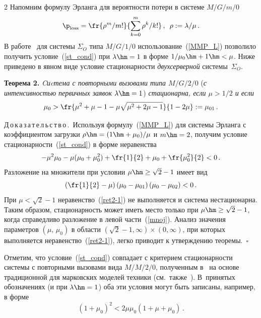 \begin{multicols}{2}
 Напомним формулу Эрланга для вероятности потери  в
 системе $M/G/m/0$~ \cite{Gnedenko}
\begin{equation} 
\label{MMP_L}
 \p_{\mathrm{loss}}=\fr{\rho^{m}/m!}{\sum\limits_{k=0}^m \rho^k/k!}\,,\enskip\rho:=\lambda/\mu\,.
\end{equation}
 В работе~\cite{MorNek} для системы $\Sigma_O$ типа $M/G/1/0 $  использование~(\ref{MMP_L})
позволило получить условие~(\ref{st_cond}) при $\lambda\hm=1$ в  форме
$1/\mu_0\hm+1\hm<\mu$. Ниже приведено в явном виде условие стационарности
{\it двухсерверной} сис\-те\-мы~$\Sigma_O$. 

\medskip

\noindent
\textbf{Теорема 2.}
 {\it Cиcтема с повторными вызовами  типа $M/G/2/0$} (\textit{с
интенсивностью первичных заявок $\lambda\hm=1$}) \textit{стационарна, если $\mu>1/2$  и
если} 
\begin{equation*} 
 \mu_0>\fr{\mu^2+\mu-1-\mu \sqrt{\mu^2+2\mu-1}}{1-2 \mu}:=\mu_{01}\,. 
\end{equation*} 

\smallskip

\noindent
Д\,о\,к\,а\,з\,а\,т\,е\,л\,ь\,с\,т\,в\,о\,.\ Используя
формулу~(\ref{MMP_L}) для системы Эрланга с коэффициентом загрузки
 $\rho\hm= (1\hm+\mu_0)/\mu$ и $m\hm=2$, получим условие стационарности~(\ref{st_cond}) в
 форме  неравенства 
\begin{equation} 
\label{ret2-1}
-\mu^2\mu_0-\mu(\mu_0+\mu_0^2)+\fr{1}{2}+\mu_0+\fr{\mu_0^2}{2}<0\,.
\end{equation}
 Разложение на множители при условии $\mu\hm\ge \sqrt{2}-1$ имеет вид
\begin{equation} 
\label{mnoj}
\left(\fr{1}{2}-\mu\right)\left(\mu_0-\mu_{01}\right)\left(\mu_0-\mu_{02}\right)<0\,. 
\end{equation}
При $\mu < \sqrt{2}-1$ неравенство~(\ref{ret2-1}) не выполняется и
сис\-те\-ма нестационарна. Таким образом, стационарность может иметь
место только при $\mu\hm\ge \sqrt{2}-1$, когда справедливо разложение в
левой части~(\ref{mnoj}). Анализ значения  параметров
$(\mu,\,\mu_0)$ в области $ (\sqrt{2}-1, \infty)\times (0, \infty)$,
при которых выполняется неравенство~(\ref{ret2-1}), легко приводит к
утверждению  теоремы.\hfill~$\square$

Отметим, что  условие~(\ref{st_cond}) совпадает с критерием
стационарности   системы с повторными вызовами вида $M/M/2/0$,
полученным в~\cite{A96} на основе традиционной для марковских моделей техники   (см.\ также~\cite {AGN01}).
 В~принятых обозначениях  (и  при $\lambda\hm=1$) оба эти условия могут
быть записаны, например,  в форме
\begin{equation*}
\left(1+\mu_0\right)^2<2 \mu \mu_0\left(1+\mu+\mu_0\right)\,.
\end{equation*}


\end{multicols}
